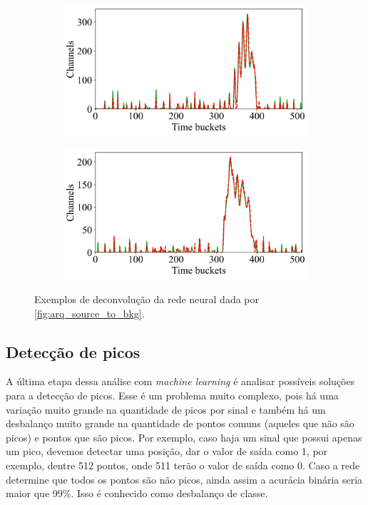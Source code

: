 \documentclass[a4paper,12pt,oneside]{book}
\begin{document}
\begin{figure}[H]
\begin{subfigure}[b]{0.465\textwidth}
        \caption{}
        \label{subfig:std_ex2}
    \end{subfigure}
    \begin{subfigure}[b]{0.49\textwidth}
        \centering
        \includegraphics[scale=0.425]{figs/swbtd_3.png}
        \caption{}
        \label{subfig:std_ex3}
    \end{subfigure}%
    \hfill
    \begin{subfigure}[b]{0.465\textwidth}
        \centering
        \includegraphics[scale=0.425]{figs/swbtd_4.png}
        \caption{}
        \label{subfig:std_ex4}
    \end{subfigure}
\caption{Exemplos de deconvolução da rede neural dada por \ref{fig:arq_source_to_bkg}.}
\label{fig:std_examples}
\end{figure}

\subsection{Detecção de picos}

\par A última etapa dessa análise com \textit{machine learning} é analisar possíveis soluções para a detecção de picos. Esse é um problema muito complexo, pois há uma variação muito grande na quantidade de picos por sinal e também há um desbalanço muito grande na quantidade de pontos comuns (aqueles que não são picos) e pontos que são picos. Por exemplo, caso haja um sinal que possui apenas um pico, devemos detectar uma posição, dar o valor de saída como 1, por exemplo, dentre 512 pontos, onde 511 terão o valor de saída como 0. Caso a rede determine que todos os pontos são não picos, ainda assim a acurácia binária seria maior que 99\%. Isso é conhecido como desbalanço de classe\cite{inproceedings}. 
\end{document}

